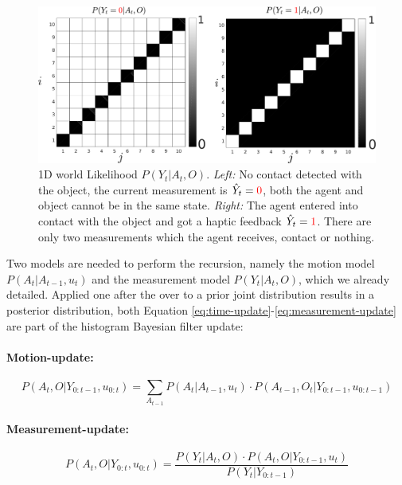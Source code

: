 \begin{figure}
 \centering
 \includegraphics[width=\textwidth]{./ch5-MLMF/Figures/explenation/hist_likelihood.pdf}
 \caption{1D world Likelihood $P(Y_t|A_t,O)$. \textit{Left:} No contact detected with the object, the current measurement 
 is $\hat{Y}_t = \textcolor{red}0$, both the agent and object cannot be in the same state. \textit{Right:} The agent 
 entered into contact with the object and got a haptic feedback $\hat{Y}_t = \textcolor{red}1$. There are only two measurements 
 which the agent receives, contact or nothing.}
 \label{fig:histogram_likelihood}
\end{figure}

Two models are needed to perform the recursion, namely the motion model $P(A_t|A_{t-1},u_t)$ and the measurement model
$P(Y_t|A_t,O)$, which we already detailed. Applied one after the over to a prior joint distribution results in a posterior
distribution, both Equation \ref{eq:time-update}-\ref{eq:measurement-update} are part of the histogram Bayesian filter 
update:

\paragraph{Motion-update:}
\begin{equation}\label{eq:time-update}
   P(A_t,O|Y_{0:t-1},u_{0:t}) = \sum_{A_{t-1}} P(A_t|A_{t-1},u_t) \cdot  P(A_{t-1},O_t|Y_{0:t-1},u_{0:t-1})
\end{equation}
\paragraph{Measurement-update:}
\begin{equation}\label{eq:measurement-update}
   P(A_t,O|Y_{0:t},u_{0:t}) = \frac{P(Y_t|A_t,O)\cdot P(A_t,O|Y_{0:t-1},u_{t}) }{P(Y_t|Y_{0:t-1})}
\end{equation}


